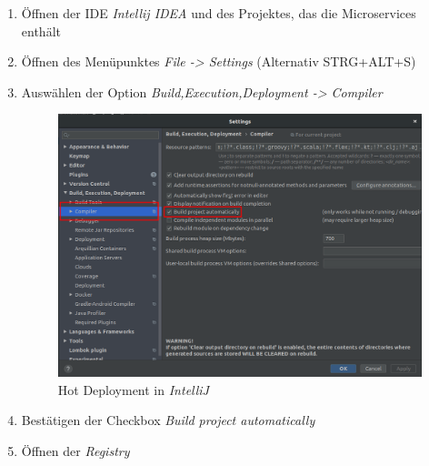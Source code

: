 \begin{enumerate}

\item Öffnen der \ac{IDE} \textit{Intellij IDEA} und des Projektes, das die Microservices enthält
\item Öffnen des Menüpunktes \textit{File -> Settings} (Alternativ \textsc{STRG+ALT+S})
\item Auswählen der Option \textit{Build,Execution,Deployment -> Compiler}

\begin{figure}[H]
\centering
\includegraphics[width=\pictureWidth cm]{Bilder/Kapitel_4/hotdeploy.png}
\caption{Hot Deployment in \textit{IntelliJ}\label{fig:hotdeploy}}
\end{figure}

\item Bestätigen der Checkbox \textit{Build project automatically}

\item Öffnen der \textit{Registry} 

\begin{enumerate}


\end{enumerate}
\end{enumerate}
